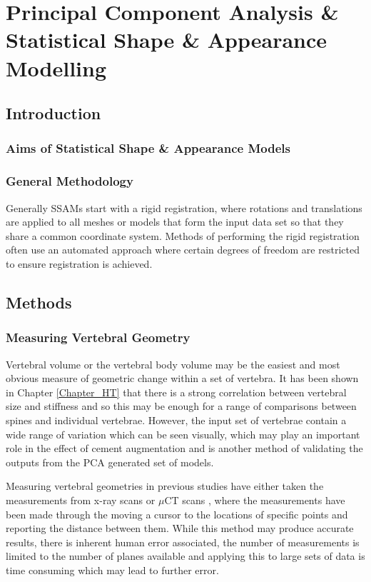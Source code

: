 \chapter{Principal Component Analysis \& Statistical Shape \& Appearance
Modelling}\label{PCA_CHAP}


\section{Introduction}

\subsection{Aims of Statistical Shape \& Appearance Models}

\subsection{General Methodology}

Generally SSAMs start with a rigid registration, where rotations and
translations are applied to all meshes or models that form the input data set
so that they share a common coordinate system.  Methods of performing the rigid
registration often use an automated approach where certain degrees of freedom
are restricted to ensure registration is achieved.



\section{Methods}

\subsection{Measuring Vertebral Geometry}

Vertebral volume or the vertebral body volume may be the easiest and most
obvious measure of geometric change within a set of vertebra.  It has been
shown in Chapter \ref{Chapter_HT} that there is a strong correlation between
vertebral size and stiffness and so this may be enough for a range of
comparisons between spines and individual vertebrae.  However, the input set of
vertebrae contain a wide range of variation which can be seen visually, which
may play an important role in the effect of cement augmentation and is another
method of validating the outputs from the PCA generated set of models.

Measuring vertebral geometries in previous studies have either taken the
measurements from x-ray scans \cite{Gilad1986,Gilad1985} or $\mu$CT scans
\cite{Zhou2000,Cheung1994}, where the measurements have been made through the
moving a cursor to the locations of specific points and reporting the distance
between them.  While this method may produce accurate results, there is
inherent human error associated, the number of measurements is limited to the
number of planes available and applying this to large sets of data is time
consuming which may lead to further error.

